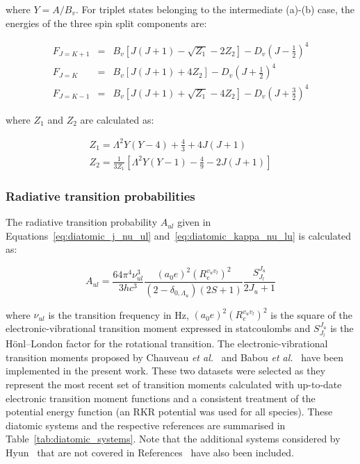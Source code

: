 \noindent where $Y = A / B_v$.
For triplet states belonging to the intermediate (a)-(b) case, the energies of the three spin split components are:

\begin{eqnarray}
 F_{J=K+1} &=&  B_v \left [ J ( J + 1 ) - \sqrt{Z_1} - 2 Z_2 \right ] - D_v \left ( J - \frac{1}{2} \right )^4 \label{eq:F_J_1_HundAB_triplet} \\
 F_{J=K} &=&  B_v \left [ J ( J + 1 ) + 4 Z_2 \right ] - D_v \left ( J + \frac{1}{2} \right )^4 \label{eq:F_J_2_HundAB_triplet} \\
 F_{J=K-1} &=&  B_v \left [ J ( J + 1 ) + \sqrt{Z_1} - 4 Z_2 \right ] - D_v \left ( J + \frac{3}{2} \right )^4 \label{eq:F_J_3_HundAB_triplet}
\end{eqnarray}

\noindent where $Z_1$ and $Z_2$ are calculated as:

\begin{eqnarray}
 Z_1 = \Lambda^2 Y \left ( Y - 4 \right ) + \frac{4}{3} + 4 J \left ( J + 1 \right ) \\
 Z_2 = \frac{1}{3Z_1} \left [ \Lambda^2 Y \left ( Y - 1 \right ) - \frac{4}{9} - 2 J \left ( J + 1 \right ) \right ]
\end{eqnarray} 

\subsubsection{Radiative transition probabilities}
\label{sec:RTP}


The radiative transition probability $A_{ul}$ given in Equations~\ref{eq:diatomic_j_nu_ul} and~\ref{eq:diatomic_kappa_nu_lu} is calculated as:

\begin{equation}
 A_{ul} = \frac{64 \pi^4 \nu_{ul}^3}{3 h c^3} \frac{ \left ( a_0 e \right )^2 \left ( R_e^{v_u v_l} \right )^2 }{ \left ( 2 - \delta_{0,\Lambda_u} \right ) \left ( 2 S + 1 \right ) } \frac{S^{J_u}_{J_l}}{2 J_u + 1}
\end{equation}

\noindent where $\nu_{ul}$ is the transition frequency in Hz, $\left ( a_0 e \right )^2 \left ( R_e^{v_u v_l} \right )^2$ is the square of the electronic-vibrational transition moment expressed in statcoulombs and $S^{J_u}_{J_l}$ is the H\"{o}nl--London factor for the rotational transition.
The electronic-vibrational transition moments proposed by Chauveau \textit{et al.}~\cite{CPR+2002} and Babou \textit{et al.}~\cite{BRP+2009} have been implemented in the present work.
These two datasets were selected as they represent the most recent set of transition moments calculated with up-to-date electronic transition moment functions and a consistent treatment of the potential energy function (an RKR potential was used for all species).
These diatomic systems and the respective references are summarised in Table~\ref{tab:diatomic_systems}.
Note that the additional systems considered by Hyun~\cite{hyun_phd} that are not covered in References~\cite{CPR+2002,BRP+2009} have also been included.


